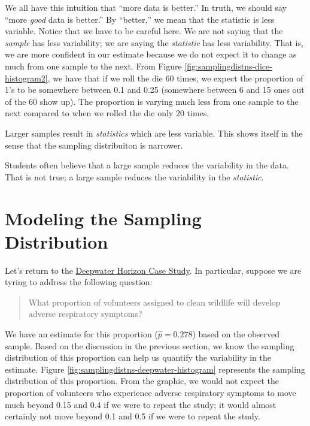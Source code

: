 \documentclass[]{book}
\theoremstyle{plain}
\theoremstyle{mydefn}
\theoremstyle{myexmpl}
\theoremstyle{remark}
\let\BeginKnitrBlock\begin \let\EndKnitrBlock\end
\let\BeginKnitrBlock\begin \let\EndKnitrBlock\end
\begin{document}
We all have this intuition that ``more data is better.'' In truth, we
should say ``more \emph{good} data is better.'' By ``better,'' we mean
that the statistic is less variable. Notice that we have to be careful
here. We are not saying that the \emph{sample} has less variability; we
are saying the \emph{statistic} has less variability. That is, we are
more confident in our estimate because we do not expect it to change as
much from one sample to the next. From Figure
\ref{fig:samplingdistns-dice-histogram2}, we have that if we roll the
die 60 times, we expect the proportion of 1's to be somewhere between
0.1 and 0.25 (somewhere between 6 and 15 ones out of the 60 show up).
The proportion is varying much less from one sample to the next compared
to when we rolled the die only 20 times.

\BeginKnitrBlock{rmdkeyidea}
Larger samples result in \emph{statistics} which are less variable. This
shows itself in the sense that the sampling distribuiton is narrower.
\EndKnitrBlock{rmdkeyidea}

\BeginKnitrBlock{rmdtip}
Students often believe that a large sample reduces the variability in
the data. That is not true; a large sample reduces the variability in
the \emph{statistic}.
\EndKnitrBlock{rmdtip}

\section{Modeling the Sampling
Distribution}\label{modeling-the-sampling-distribution}

Let's return to the \protect\hyperlink{CaseDeepwater}{Deepwater Horizon
Case Study}. In particular, suppose we are tyring to address the
following question:

\begin{quote}
What proportion of volunteers assigned to clean wildlife will develop
adverse respiratory symptoms?
\end{quote}

We have an estimate for this proportion (\(\widehat{p} = 0.278\)) based
on the observed sample. Based on the discussion in the previous section,
we know the sampling distribution of this proportion can help us
quantify the variability in the estimate. Figure
\ref{fig:samplingdistns-deepwater-histogram} represents the sampling
distribution of this proportion. From the graphic, we would not expect
the proportion of volunteers who experience adverse respiratory symptoms
to move much beyond 0.15 and 0.4 if we were to repeat the study; it
would almost certainly not move beyond 0.1 and 0.5 if we were to repeat
the study.
\end{document}
